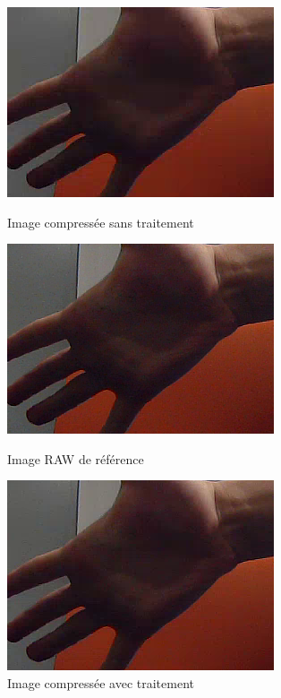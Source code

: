\documentclass[11pt,a4paper]{article}
\begin{document}
\begin{figure}[H]
  \includegraphics[width=\linewidth]{images/comparaison_zoom_normal.png}
  \caption{Image compressée sans traitement}
\endminipage\hfill
{}
  \includegraphics[width=\linewidth]{images/comparaison_zoom_raw.png}
  \caption{Image RAW de référence\newline}
\endminipage\hfill
{}
  \includegraphics[width=\linewidth]{images/comparaison_zoom_snr.png}
  \caption{Image compressée avec traitement}
\endminipage
\end{figure}
\end{document}
